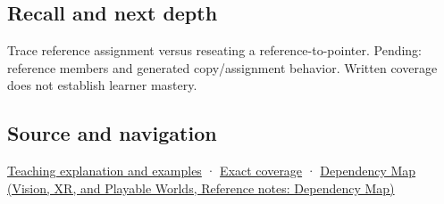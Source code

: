 \subsection{Recall and next depth}\label{appendix-d6d562ca9fbb-recall-and-next-depth}

Trace reference assignment versus reseating a reference-to-pointer. Pending: reference members and generated copy/assignment behavior. Written coverage does not establish learner mastery.

\subsection{Source and navigation}\label{appendix-d6d562ca9fbb-source-and-navigation}

\hyperref[01-foundations-i-ch003-giving-another-name-to-a-live-object]{Teaching explanation and examples} · \hyperref[appendix-fd090d982a15-m008---parts-113-126]{Exact coverage} · \href{../07-Vision-XR-and-Playable-Worlds/main.pdf\#nameddest=appendix-4ad47bdd269a}{Dependency Map (Vision, XR, and Playable Worlds, Reference notes: Dependency Map)}

